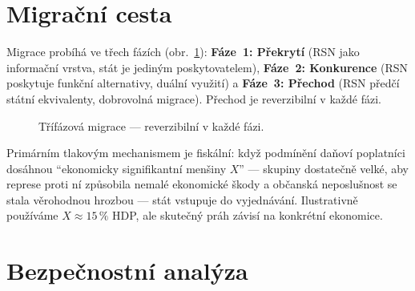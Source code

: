\documentclass[11pt,a4paper,twocolumn]{article}
\begin{document}
\section{Migrační cesta}

Migrace probíhá ve třech fázích (obr.~\ref{fig:migration}): \textbf{Fáze~1: Překrytí} (RSN jako informační vrstva, stát je jediným poskytovatelem), \textbf{Fáze~2: Konkurence} (RSN poskytuje funkční alternativy, duální využití) a \textbf{Fáze~3: Přechod} (RSN předčí státní ekvivalenty, dobrovolná migrace). Přechod je reverzibilní v každé fázi.

\begin{figure}[ht]
\centering
{}
\caption{Třífázová migrace --- reverzibilní v každé fázi.}
\label{fig:migration}
\end{figure}

Primárním tlakovým mechanismem je fiskální: když podmínění daňoví poplatníci dosáhnou ``ekonomicky signifikantní menšiny $X$'' --- skupiny dostatečně velké, aby represe proti ní způsobila nemalé ekonomické škody a občanská neposlušnost se stala věrohodnou hrozbou --- stát vstupuje do vyjednávání. Ilustrativně používáme $X \approx 15\,\%$ HDP, ale skutečný práh závisí na konkrétní ekonomice.

\section{Bezpečnostní analýza}
\end{document}
